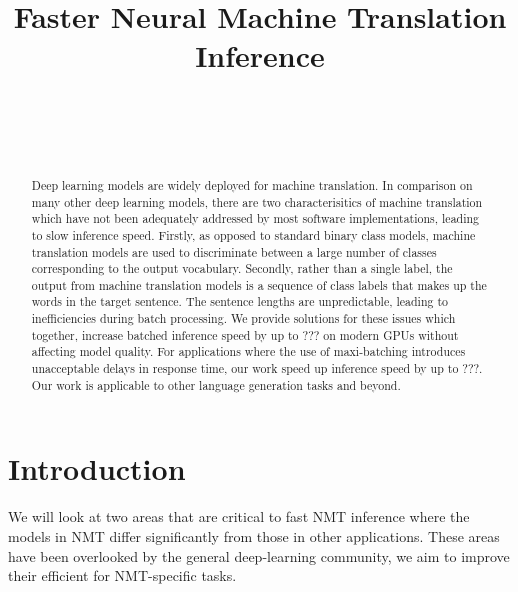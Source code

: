 \documentclass[]{article}
\begin{document}
\title{\bf Faster Neural Machine Translation Inference}  

\author{ \hfill  {}\\ 
        \addr{}
\AND
        \hfill {}\\
\AND
        \hfill {}\\
}

\maketitle
\pagestyle{empty}

\begin{abstract}

Deep learning models are widely deployed for machine translation. In comparison on many other deep learning models, there are two characterisitics of machine translation which have not been adequately addressed by most software implementations, leading to slow inference speed. Firstly, as opposed to standard binary class models, machine translation models are used to discriminate between a large number of classes corresponding to the output vocabulary. Secondly, rather than a single label, the output from machine translation models is a sequence of class labels that makes up the words in the target sentence. The sentence lengths are unpredictable, leading to inefficiencies during batch processing. We provide solutions for these issues which together, increase batched inference speed by up to ??? on modern GPUs without affecting model quality. For applications where the use of maxi-batching introduces unacceptable delays in response time, our work speed up inference speed by up to ???. Our work is applicable to other language generation tasks and beyond.

\end{abstract}

\section{Introduction}

We will look at two areas that are critical to fast NMT inference where the models in NMT differ significantly from those in other applications. These areas have been overlooked by the general deep-learning community, we aim to improve their efficient for NMT-specific tasks.
\end{document}
